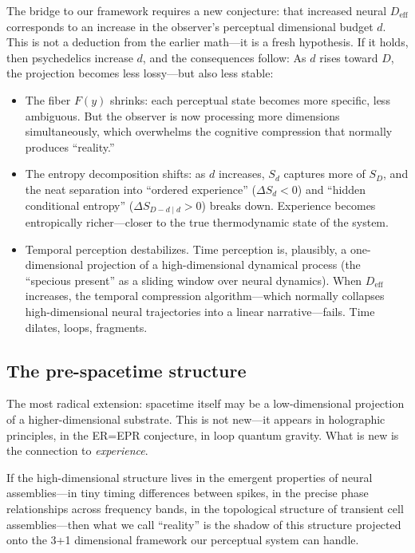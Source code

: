\documentclass[12pt,a4paper]{article}
\begin{document}
The bridge to our framework requires a new conjecture: that increased neural $D_{\mathrm{eff}}$ corresponds to an increase in the observer's perceptual dimensional budget $d$.
This is not a deduction from the earlier math---it is a fresh hypothesis.
If it holds, then psychedelics increase $d$, and the consequences follow:
As $d$ rises toward $D$, the projection becomes less lossy---but also less stable:
\begin{itemize}
\item The fiber $F(y)$ shrinks: each perceptual state becomes more specific, less ambiguous.
But the observer is now processing more dimensions simultaneously, which overwhelms the cognitive compression that normally produces ``reality.''

\item The entropy decomposition shifts: as $d$ increases, $S_d$ captures more of $S_D$, and the neat separation into ``ordered experience'' ($\Delta S_d < 0$) and ``hidden conditional entropy'' ($\Delta S_{D-d \mid d} > 0$) breaks down.
Experience becomes entropically richer---closer to the true thermodynamic state of the system.

\item Temporal perception destabilizes.
Time perception is, plausibly, a one-dimensional projection of a high-dimensional dynamical process (the ``specious present'' as a sliding window over neural dynamics).
When $D_{\mathrm{eff}}$ increases, the temporal compression algorithm---which normally collapses high-dimensional neural trajectories into a linear narrative---fails.
Time dilates, loops, fragments.
\end{itemize}

\subsection{The pre-spacetime structure}

The most radical extension: spacetime itself may be a low-dimensional projection of a higher-dimensional substrate.
This is not new---it appears in holographic principles, in the ER=EPR conjecture, in loop quantum gravity.
What is new is the connection to \emph{experience}.

If the high-dimensional structure lives in the emergent properties of neural assemblies---in tiny timing differences between spikes, in the precise phase relationships across frequency bands, in the topological structure of transient cell assemblies---then what we call ``reality'' is the shadow of this structure projected onto the 3+1 dimensional framework our perceptual system can handle.
\end{document}
